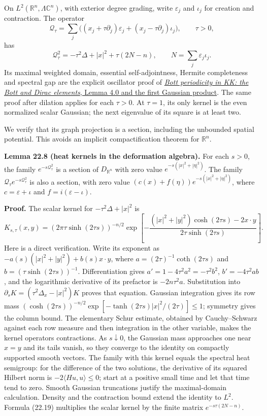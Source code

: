 \documentclass[
  11pt,
]{article}
\begin{document}
On \(L^2(\mathbb R^n,\Lambda\mathbb C^n)\), with exterior degree
grading, write \(\varepsilon_j\) and \(\iota_j\) for creation and
contraction. The operator \[
\mathcal Q_\tau=\sum_j
\bigl((x_j+\tau\partial_j)\varepsilon_j
 +(x_j-\tau\partial_j)\iota_j\bigr),\qquad \tau>0,
\tag{22.18}
\] has \[
\mathcal Q_\tau^2=-\tau^2\Delta+|x|^2
 +\tau(2N-n),\qquad N=\sum_j\varepsilon_j\iota_j.
\tag{22.19}
\] Its maximal weighted domain, essential self-adjointness, Hermite
completeness and spectral gap are the explicit oscillator proof of
\href{KT-KK-12.html\#4-the-first-product-and-its-gaussian}{\emph{Bott
periodicity in KK: the Bott and Dirac elements}, Lemma 4.0 and the first
Gaussian product}. The same proof after dilation applies for each
\(\tau>0\). At \(\tau=1\), its only kernel is the even normalized scalar
Gaussian; the next eigenvalue of its square is at least two.

We verify that its graph projection is a section, including the
unbounded spatial potential. This avoids an implicit compactification
theorem for \(\mathbb R^n\).

\textbf{Lemma 22.8 (heat kernels in the deformation algebra).} For each
\(s>0\), the family \(e^{-s\mathcal Q_\tau^2}\) is a section of
\(D_{\mathbb R^n}\) with zero value \(e^{-s(|x|^2+|\eta|^2)}\). The
family \(\mathcal Q_\tau e^{-s\mathcal Q_\tau^2}\) is also a section,
with zero value \((c(x)+f(\eta))e^{-s(|x|^2+|\eta|^2)}\), where
\(c=\varepsilon+\iota\) and \(f=i(\varepsilon-\iota)\).

\textbf{Proof.} The scalar kernel for \(-\tau^2\Delta+|x|^2\) is \[
K_{s,\tau}(x,y)=
(2\pi\tau\sinh(2\tau s))^{-n/2}
\exp\!\left[-\frac{(|x|^2+|y|^2)\cosh(2\tau s)-2x\cdot y}
 {2\tau\sinh(2\tau s)}\right].
\tag{22.20}
\] Here is a direct verification. Write its exponent as
\(-a(s)(|x|^2+|y|^2)+b(s)x\cdot y\), where
\(a=(2\tau)^{-1}\coth(2\tau s)\) and \(b=(\tau\sinh(2\tau s))^{-1}\).
Differentiation gives \(a'=1-4\tau^2a^2=-\tau^2b^2\), \(b'=-4\tau^2ab\),
and the logarithmic derivative of its prefactor is \(-2n\tau^2a\).
Substitution into \(\partial_sK=(\tau^2\Delta_x-|x|^2)K\) proves that
equation. Gaussian integration gives its row mass
\((\cosh(2\tau s))^{-n/2}\exp[-\tanh(2\tau s)|x|^2/(2\tau)]\leq1\);
symmetry gives the column bound. The elementary Schur estimate, obtained
by Cauchy--Schwarz against each row measure and then integration in the
other variable, makes the kernel operators contractions. As
\(s\downarrow0\), the Gaussian mass approaches one near \(x=y\) and its
tails vanish, so they converge to the identity on compactly supported
smooth vectors. The family with this kernel equals the spectral heat
semigroup: for the difference of the two solutions, the derivative of
its squared Hilbert norm is \(-2\langle Hu,u\rangle\leq0\); start at a
positive small time and let that time tend to zero. Smooth Gaussian
truncations justify the maximal-domain calculation. Density and the
contraction bound extend the identity to \(L^2\). Formula (22.19)
multiplies the scalar kernel by the finite matrix \(e^{-s\tau(2N-n)}\).
\end{document}
